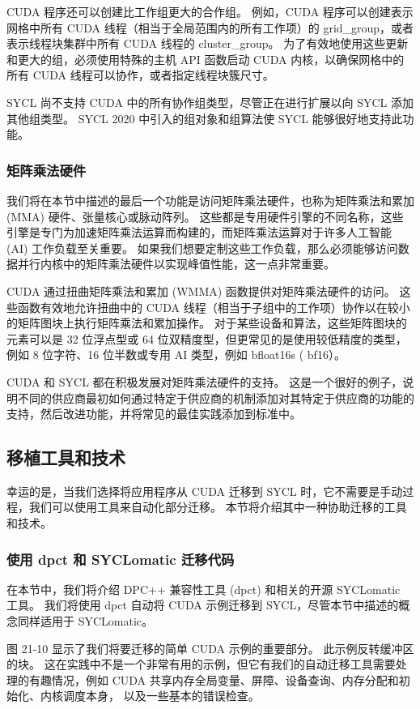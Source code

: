 CUDA 程序还可以创建比工作组更大的合作组。 例如，CUDA 程序可以创建表示网格中所有 CUDA 线程（相当于全局范围内的所有工作项）的 grid\_group，或者表示线程块集群中所有 CUDA 线程的 cluster\_group。 为了有效地使用这些更新和更大的组，必须使用特殊的主机 API 函数启动 CUDA 内核，以确保网格中的所有 CUDA 线程可以协作，或者指定线程块簇尺寸。

SYCL 尚不支持 CUDA 中的所有协作组类型，尽管正在进行扩展以向 SYCL 添加其他组类型。 SYCL 2020 中引入的组对象和组算法使 SYCL 能够很好地支持此功能。

\subsubsection{矩阵乘法硬件}
我们将在本节中描述的最后一个功能是访问矩阵乘法硬件，也称为矩阵乘法和累加 (MMA) 硬件、张量核心或脉动阵列。 这些都是专用硬件引擎的不同名称，这些引擎是专门为加速矩阵乘法运算而构建的，而矩阵乘法运算对于许多人工智能 (AI) 工作负载至关重要。 如果我们想要定制这些工作负载，那么必须能够访问数据并行内核中的矩阵乘法硬件以实现峰值性能，这一点非常重要。

CUDA 通过扭曲矩阵乘法和累加 (WMMA) 函数提供对矩阵乘法硬件的访问。 这些函数有效地允许扭曲中的 CUDA 线程（相当于子组中的工作项）协作以在较小的矩阵图块上执行矩阵乘法和累加操作。 对于某些设备和算法，这些矩阵图块的元素可以是 32 位浮点型或 64 位双精度型，但更常见的是使用较低精度的类型，例如 8 位字符、16 位半数或专用 AI 类型，例如 bfloat16s ( bf16）。

CUDA 和 SYCL 都在积极发展对矩阵乘法硬件的支持。 这是一个很好的例子，说明不同的供应商最初如何通过特定于供应商的机制添加对其特定于供应商的功能的支持，然后改进功能，并将常见的最佳实践添加到标准中。

\subsection{移植工具和技术}
幸运的是，当我们选择将应用程序从 CUDA 迁移到 SYCL 时，它不需要是手动过程，我们可以使用工具来自动化部分迁移。 本节将介绍其中一种协助迁移的工具和技术。

\subsubsection{使用 dpct 和 SYCLomatic 迁移代码}
在本节中，我们将介绍 DPC++ 兼容性工具 (dpct) 和相关的开源 SYCLomatic 工具。 我们将使用 dpct 自动将 CUDA 示例迁移到 SYCL，尽管本节中描述的概念同样适用于 SYCLomatic。

图 21-10 显示了我们将要迁移的简单 CUDA 示例的重要部分。 此示例反转缓冲区的块。 这在实践中不是一个非常有用的示例，但它有我们的自动迁移工具需要处理的有趣情况，例如 CUDA 共享内存全局变量、屏障、设备查询、内存分配和初始化、内核调度本身， 以及一些基本的错误检查。

